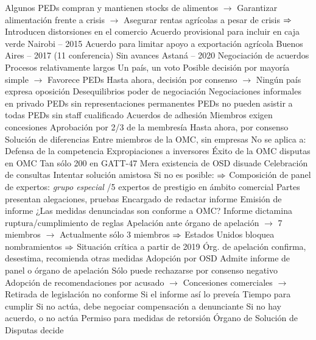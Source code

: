 \documentclass{nuevotema}
\begin{document}
\begin{esquemal}
				\4[] Algunos PEDs compran y mantienen stocks de alimentos
				\4[] $\to$ Garantizar alimentación frente a crisis
				\4[] $\to$ Asegurar rentas agrícolas a pesar de crisis
				\4[] $\Rightarrow$ Introducen distorsiones en el comercio
				\4[] Acuerdo provisional para incluir en caja verde
				\4 Nairobi -- 2015
				\4[] Acuerdo para limitar apoyo a exportación agrícola
				\4 Buenos Aires -- 2017 (11 conferencia)
				\4[] Sin avances
				\4 Astaná -- 2020
			\3 Negociación de acuerdos
				\4 Procesos relativamente largos
				\4 Un país, un voto
				\4 Posible decisión por mayoría simple
				\4[] $\to$ Favorece PEDs
				\4 Hasta ahora, decisión por consenso
				\4[] $\to$ Ningún país expresa oposición
				\4 Desequilibrios poder de negociación
				\4[] Negociaciones informales en privado
				\4[] PEDs sin representaciones permanentes
				\4[] PEDs no pueden asistir a todas
				\4[] PEDs sin staff cualificado
				\4 Acuerdos de adhesión
				\4[] Miembros exigen concesiones
				\4[] Aprobación por 2/3 de la membresía
				\4[] Hasta ahora, por consenso
			\3 Solución de diferencias
				\4 Entre miembros de la OMC, sin empresas
				\4 No se aplica a:
				\4[] Defensa de la competencia
				\4[] Expropiaciones a inversores
				\4 Éxito de la OMC
				 disputas en OMC
				\4[] Tan sólo 200 en GATT-47
				\4[] Mera existencia de OSD disuade
				\4[1] Celebración de consultas
				\4[] Intentar solución amistosa
				\4[] Si no es posible: $\Rightarrow$
				\4[2] Composición de panel de expertos: \textit{grupo especial}
				/5 expertos de prestigio en ámbito comercial
				\4[] Partes presentan alegaciones, pruebas
				\4[] Encargado de redactar informe
				\4[3] Emisión de informe
				\4[] ¿Las medidas denunciadas son conforme a OMC?
				\4[] Informe dictamina ruptura/cumplimiento de reglas
				\4[4] Apelación ante órgano de apelación
				\4[] $\to$ 7 miembros
				\4[] $\to$ Actualmente sólo 3 miembros
				\4[] $\Rightarrow$ Estados Unidos bloquea nombramientos
				\4[] $\Rightarrow$ Situación crítica a partir de 2019
				\4[] Órg. de apelación confirma, desestima, recomienda otras medidas
				\4[5] Adopción por OSD
				\4[] Admite informe de panel o órgano de apelación
				\4[] Sólo puede rechazarse por consenso negativo
				\4[6] Adopción de recomendaciones por acusado
				\4[] $\to$ Concesiones comerciales
				\4[] $\to$ Retirada de legislación no conforme
				\4[] Si el informe así lo preveía
				\4[] Tiempo para cumplir
				\4[] Si no actúa, debe negociar compensación a denunciante
				\4[] Si no hay acuerdo, o no actúa
				\4[7] Permiso para medidas de retorsión
				\4[] Órgano de Solución de Disputas decide

\end{esquemal}
\end{document}

